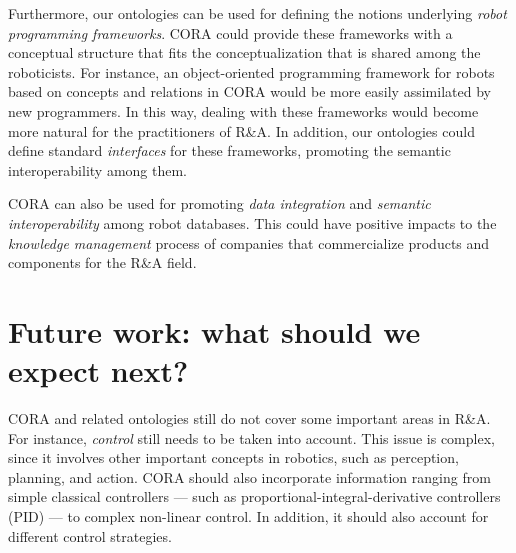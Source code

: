 \documentclass[preprint,12pt]{elsarticle}
\begin{document}
Furthermore, our ontologies can be used for defining the notions underlying \emph{robot programming frameworks}. CORA could provide these frameworks with a conceptual structure that fits the conceptualization that is shared among the roboticists. For instance, an object-oriented programming framework for robots based on concepts and relations in CORA would be more easily assimilated by new programmers. In this way, dealing with these frameworks would become more natural for the practitioners of R\&A. In addition, our ontologies could define standard \emph{interfaces} for these frameworks, promoting the semantic interoperability among them. %

CORA can also be used for promoting \emph{data integration} and \emph{semantic interoperability} among robot databases. This could have positive impacts to the \emph{knowledge management} process of companies that commercialize products and components for the R\&A field.


\section{Future work: what should we expect next?}

CORA and related ontologies still do not cover some important areas in R\&A. For instance, \emph{control} still needs to be taken into account. This issue is complex, since it involves other important concepts in robotics, such as perception, planning, and action. CORA should also incorporate information ranging from simple classical controllers --- such as proportional-integral-derivative controllers (PID) --- to complex non-linear control. In addition, it should also account for different control strategies. 

\end{document}
